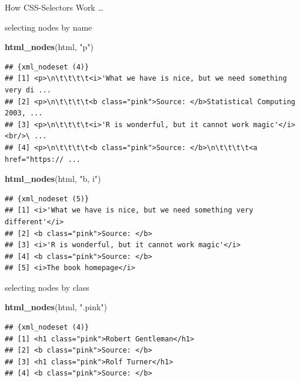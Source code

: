 \documentclass[ignorenonframetext,]{beamer}
\newenvironment{Shaded}{\begin{snugshade}}{\end{snugshade}}
\newcommand{\KeywordTok}[1]{\textcolor[rgb]{0.13,0.29,0.53}{\textbf{{#1}}}}
\newcommand{\StringTok}[1]{\textcolor[rgb]{0.31,0.60,0.02}{{#1}}}
\newcommand{\NormalTok}[1]{{#1}}
\begin{document}
\begin{frame}[fragile]{How CSS-Selectors Work \ldots{}}
\begin{block}{selecting nodes by name}

\begin{Shaded}
\begin{Highlighting}[]
\KeywordTok{html_nodes}\NormalTok{(html, }\StringTok{"p"}\NormalTok{)}
\end{Highlighting}
\end{Shaded}

\begin{verbatim}
## {xml_nodeset (4)}
## [1] <p>\n\t\t\t\t<i>'What we have is nice, but we need something very di ...
## [2] <p>\n\t\t\t\t<b class="pink">Source: </b>Statistical Computing 2003, ...
## [3] <p>\n\t\t\t\t<i>'R is wonderful, but it cannot work magic'</i><br/>\ ...
## [4] <p>\n\t\t\t\t<b class="pink">Source: </b>\n\t\t\t\t<a href="https:// ...
\end{verbatim}

\begin{Shaded}
\begin{Highlighting}[]
\KeywordTok{html_nodes}\NormalTok{(html, }\StringTok{"b, i"}\NormalTok{)}
\end{Highlighting}
\end{Shaded}

\begin{verbatim}
## {xml_nodeset (5)}
## [1] <i>'What we have is nice, but we need something very different'</i>
## [2] <b class="pink">Source: </b>
## [3] <i>'R is wonderful, but it cannot work magic'</i>
## [4] <b class="pink">Source: </b>
## [5] <i>The book homepage</i>
\end{verbatim}

\end{block}

\begin{block}{selecting nodes by class}

\begin{Shaded}
\begin{Highlighting}[]
\KeywordTok{html_nodes}\NormalTok{(html, }\StringTok{".pink"}\NormalTok{)}
\end{Highlighting}
\end{Shaded}

\begin{verbatim}
## {xml_nodeset (4)}
## [1] <h1 class="pink">Robert Gentleman</h1>
## [2] <b class="pink">Source: </b>
## [3] <h1 class="pink">Rolf Turner</h1>
## [4] <b class="pink">Source: </b>
\end{verbatim}


\end{block}
\end{frame}
\end{document}
